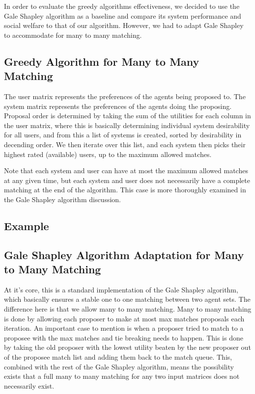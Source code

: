\documentclass[11pt, letterpaper]{article}
\begin{document}
In order to evaluate the greedy algorithms effectiveness, we decided to use the Gale Shapley algorithm as a baseline and compare its system performance and social welfare to that of our algorithm.  However, we had to adapt Gale Shapley to accommodate for many to many matching. 

\subsection{Greedy Algorithm for Many to Many Matching}
The user matrix represents the preferences of the agents being proposed to.  The system matrix represents the preferences of the agents doing the proposing.  Proposal order is determined by taking the sum of the utilities for each column in the user matrix, where this is basically determining individual system desirability for all users, and from this a list of systems is created, sorted by desirability in decending order.  We then iterate over this list, and each system then picks their highest rated (available) users, up to the maximum allowed matches.  

Note that each system and user can have at most the maximum allowed matches at any given time, but each system and user does not necessarily have a complete matching at the end of the algorithm.  This case is more thoroughly examined in the Gale Shapley algorithm discussion.   

	\subsection{Example}

\subsection{Gale Shapley Algorithm Adaptation for Many to Many Matching}
At it's core, this is a standard implementation of the Gale Shapley algorithm, which basically ensures a stable one to one matching between two agent sets.  The difference here is that we allow many to many matching.  Many to many matching is done by allowing each proposer to make at most max matches proposals each iteration.  An important case to mention is when a proposer tried to match to a proposee with the max matches and tie breaking needs to happen.  This is done by taking the old proposer with the lowest utility beaten by the new proposer out of the proposee match list and adding them back to the match queue.  This, combined with the rest of the Gale Shapley algorithm, means the possibility exists that a full many to many matching for any two input matrices does not necessarily exist.
\end{document}

